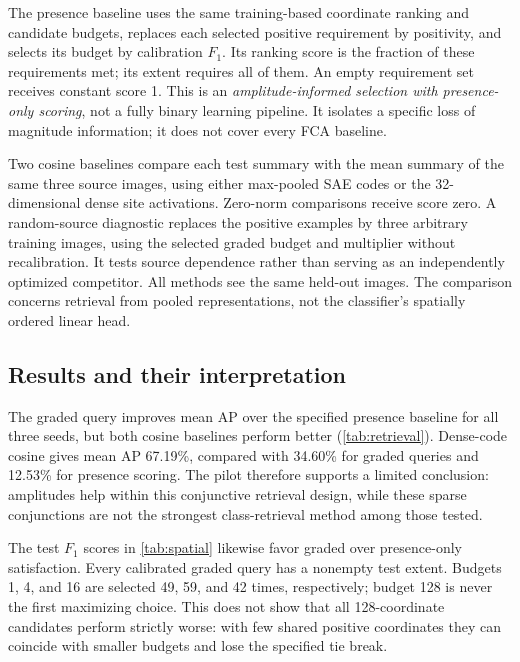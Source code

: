 The presence baseline uses the same training-based coordinate ranking
and candidate budgets, replaces each selected positive requirement by
positivity, and selects its budget by calibration $F_{1}$. Its ranking
score is the fraction of these requirements met; its extent requires all
of them. An empty requirement set receives constant score 1. This is an
\emph{amplitude-informed selection with presence-only scoring}, not a
fully binary learning pipeline. It isolates a specific loss of magnitude
information; it does not cover every FCA baseline.

Two cosine baselines compare each test summary with the mean summary of
the same three source images, using either max-pooled SAE codes or the
32-dimensional dense site activations. Zero-norm comparisons receive
score zero. A random-source diagnostic replaces the positive examples
by three arbitrary training images, using the selected graded budget and
multiplier without recalibration. It tests source dependence rather than
serving as an independently optimized competitor. All methods see the
same held-out images. The comparison concerns retrieval from pooled
representations, not the classifier's spatially ordered linear head.

\subsection{Results and their interpretation}
\label{sub:pilot-results}



The graded query improves mean AP over the specified presence baseline
for all three seeds, but both cosine baselines perform better
(\cref{tab:retrieval}). Dense-code cosine gives mean AP 67.19\%, compared
with 34.60\% for graded queries and 12.53\% for presence scoring. The
pilot therefore supports a limited conclusion: amplitudes help within
this conjunctive retrieval design, while these sparse conjunctions are
not the strongest class-retrieval method among those tested.

The test $F_{1}$ scores in \cref{tab:spatial} likewise favor graded over
presence-only satisfaction. Every calibrated graded query has a nonempty
test extent. Budgets 1, 4, and 16 are selected 49, 59, and 42 times,
respectively; budget 128 is never the first maximizing choice. This does
not show that all 128-coordinate candidates perform strictly worse:
with few shared positive coordinates they can coincide with smaller
budgets and lose the specified tie break.

